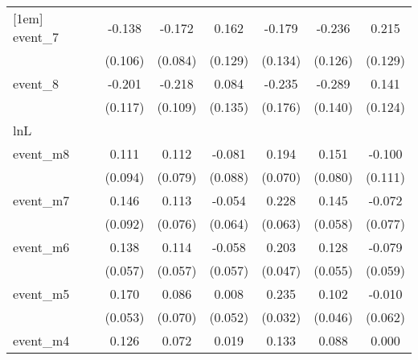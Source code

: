 {\begin{tabular}{l*{6}{c}}
[1em]
event\_7     &      -0.138         &      -0.172\sym{*}  &       0.162         &      -0.179         &      -0.236         &       0.215         \\
            &     (0.106)         &     (0.084)         &     (0.129)         &     (0.134)         &     (0.126)         &     (0.129)         \\
[1em]
event\_8     &      -0.201         &      -0.218\sym{*}  &       0.084         &      -0.235         &      -0.289\sym{*}  &       0.141         \\
            &     (0.117)         &     (0.109)         &     (0.135)         &     (0.176)         &     (0.140)         &     (0.124)         \\
\hline
lnL         &                     &                     &                     &                     &                     &                     \\
event\_m8    &       0.111         &       0.112         &      -0.081         &       0.194\sym{**} &       0.151         &      -0.100         \\
            &     (0.094)         &     (0.079)         &     (0.088)         &     (0.070)         &     (0.080)         &     (0.111)         \\
[1em]
event\_m7    &       0.146         &       0.113         &      -0.054         &       0.228\sym{***}&       0.145\sym{*}  &      -0.072         \\
            &     (0.092)         &     (0.076)         &     (0.064)         &     (0.063)         &     (0.058)         &     (0.077)         \\
[1em]
event\_m6    &       0.138\sym{*}  &       0.114\sym{*}  &      -0.058         &       0.203\sym{***}&       0.128\sym{*}  &      -0.079         \\
            &     (0.057)         &     (0.057)         &     (0.057)         &     (0.047)         &     (0.055)         &     (0.059)         \\
[1em]
event\_m5    &       0.170\sym{**} &       0.086         &       0.008         &       0.235\sym{***}&       0.102\sym{*}  &      -0.010         \\
            &     (0.053)         &     (0.070)         &     (0.052)         &     (0.032)         &     (0.046)         &     (0.062)         \\
[1em]
event\_m4    &       0.126\sym{**} &       0.072         &       0.019         &       0.133\sym{*}  &       0.088\sym{*}  &       0.000         \\

\end{tabular}}
